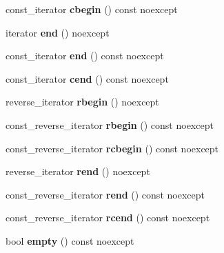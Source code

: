\begin{DoxyCompactItemize}
const\+\_\+iterator {\bfseries cbegin} () const noexcept
\item 
\mbox{\label{classtsl_1_1ordered__set_a5aa697b0fafb7028551f4d4f66381ca8}} 
iterator {\bfseries end} () noexcept
\item 
\mbox{\label{classtsl_1_1ordered__set_aa2eb040a0129c07e9735448b114ab5e8}} 
const\+\_\+iterator {\bfseries end} () const noexcept
\item 
\mbox{\label{classtsl_1_1ordered__set_a54476254fe316471d65ff77a73941fb5}} 
const\+\_\+iterator {\bfseries cend} () const noexcept
\item 
\mbox{\label{classtsl_1_1ordered__set_a5e062f9c1505b58ad17726d9accdfa21}} 
reverse\+\_\+iterator {\bfseries rbegin} () noexcept
\item 
\mbox{\label{classtsl_1_1ordered__set_ad2b6e77078a912cfaea9ebc45e876aea}} 
const\+\_\+reverse\+\_\+iterator {\bfseries rbegin} () const noexcept
\item 
\mbox{\label{classtsl_1_1ordered__set_aa37e8d6244ab4f608e00b619e14433a5}} 
const\+\_\+reverse\+\_\+iterator {\bfseries rcbegin} () const noexcept
\item 
\mbox{\label{classtsl_1_1ordered__set_ae499a978d0a0aec34cdc37ade4137aff}} 
reverse\+\_\+iterator {\bfseries rend} () noexcept
\item 
\mbox{\label{classtsl_1_1ordered__set_aa0d74ddd51e82e4b632057b69935b116}} 
const\+\_\+reverse\+\_\+iterator {\bfseries rend} () const noexcept
\item 
\mbox{\label{classtsl_1_1ordered__set_a4bad2ff2e0a44fc871f8350b44a40e16}} 
const\+\_\+reverse\+\_\+iterator {\bfseries rcend} () const noexcept
\item 
\mbox{\label{classtsl_1_1ordered__set_a023ea62fd39e755099542ff6dda50d1e}} 
bool {\bfseries empty} () const noexcept
\item 

\end{DoxyCompactItemize}
